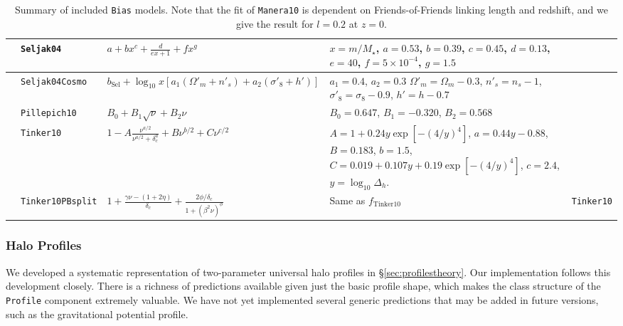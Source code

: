 \documentclass[5p]{elsarticle}
\begin{document}
\begin{table}
\begin{tabu}{X[1.4l]X[1.2l]X[2.6l]X[1.9l]X[0.6l]}
\citet{Seljak2004} & \texttt{Seljak04} & $\displaystyle a + bx^c + \frac{d}{ex+1} + fx^g$ & $x=m/M_\star$, $a=0.53$, $b=0.39$, $c=0.45$, $d=0.13$, $e=40$, $f=5\times10^{-4}$, $g=1.5$ & \\
\midrule
\citet{Seljak2004} & \texttt{Seljak04Cosmo} & $\displaystyle b_\text{Sel} + \log_{10}x \left[a_1(\Omega'_m + n'_s) + a_2(\sigma'_8 + h')\right]$ & $a_1 = 0.4$, $a_2=0.3$ $\Omega'_m=\Omega_m-0.3$, $n'_s = n_s-1$, $\sigma'_8 = \sigma_8-0.9$, $h' = h-0.7$& \\
\midrule
\citet{Pillepich2010} & \texttt{Pillepich10} & $\displaystyle B_0 + B_1\sqrt{\nu} + B_2\nu$ & $B_0=0.647$, $B_1=-0.320$, $B_2=0.568$ & \\
\midrule
 \citet{Tinker2010} & \texttt{Tinker10} & $\displaystyle 1 - A\frac{\nu^{a/2}}{\nu^{a/2} + \delta_c^a} + B\nu^{b/2} + C\nu^{c/2}$ & $A=1+0.24y\exp[-(4/y)^4]$, $a = 0.44 y - 0.88$, $B = 0.183$, $b = 1.5$, $C = 0.019+0.107y+0.19\exp[-(4/y)^4]$, $c = 2.4$, $y=\log_{10}\Delta_h$. &  \\
 \midrule
 \citet{Tinker2010} & \texttt{Tinker10PBsplit} & $\displaystyle 1 + \frac{\gamma\nu-(1+2\eta)}{\delta_c} + \frac{2\phi/\delta_c}{1+(\beta^2\nu)^\phi}$ & Same as $f_\text{Tinker10}$ & \texttt{Tinker10} \\
 \bottomrule[0.05cm]
 \end{tabu}
 \caption[Summary of included \texttt{Bias} models]{Summary of included \texttt{Bias} models. Note that the fit of \texttt{Manera10} is dependent on Friends-of-Friends linking length and redshift, and we give the result for $l = 0.2$ at $z=0$.}
\label{tab:models_bias}

\end{table}
\endgroup

\subsubsection{Halo Profiles}
\label{sec:halomod:components:profile}
We developed a systematic representation of two-parameter universal halo profiles in \S\ref{sec:profilestheory}. Our implementation follows this development closely. There is a richness of predictions available given just the basic profile shape, which makes the class structure of the \verb|Profile| component extremely valuable. We have not yet implemented several generic predictions that may be added in future versions, such as the gravitational potential profile.
\end{document}
